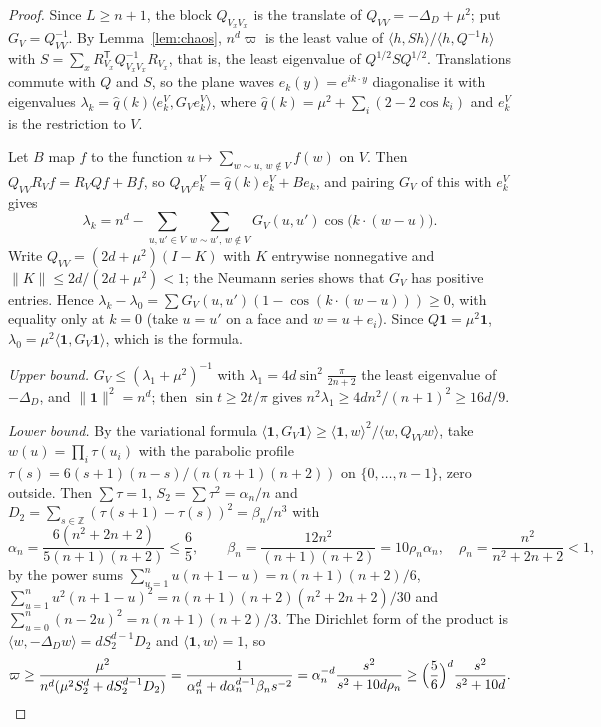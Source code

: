 \documentclass[11pt]{amsart}
\theoremstyle{definition}
\theoremstyle{remark}
\numberwithin{equation}{section}
\newcommand{\Z}{\mathbb{Z}}
\newcommand{\ip}[2]{\langle #1,#2\rangle}
\begin{document}
\begin{proof}
Since $L\ge n+1$, the block $Q_{V_xV_x}$ is the translate of $Q_{VV}=-\Delta_D+
\mu^2$; put $G_V=Q_{VV}^{-1}$. By Lemma~\ref{lem:chaos}, $n^d\varpi$ is the least
value of $\ip h{Sh}/\ip h{Q^{-1}h}$ with $S=\sum_xR_{V_x}^{\mathsf T}Q_{V_xV_x}^{-1}
R_{V_x}$, that is, the least eigenvalue of $Q^{1/2}SQ^{1/2}$. Translations commute
with $Q$ and $S$, so the plane waves $e_k(y)=e^{ik\cdot y}$ diagonalise it with
eigenvalues $\lambda_k=\hat q(k)\ip{e_k^V}{G_Ve_k^V}$, where $\hat q(k)=\mu^2+
\sum_i(2-2\cos k_i)$ and $e_k^V$ is the restriction to $V$.

Let $B$ map $f$ to the function $u\mapsto\sum_{w\sim u,\,w\notin V}f(w)$ on $V$.
Then $Q_{VV}R_Vf=R_VQf+Bf$, so $Q_{VV}e_k^V=\hat q(k)e_k^V+Be_k$, and pairing
$G_V$ of this with $e_k^V$ gives
\[
\lambda_k=n^d-\sum_{u,u'\in V}\sum_{w\sim u',\,w\notin V}G_V(u,u')\cos\bigl(k\cdot
(w-u)\bigr).
\]
Write $Q_{VV}=(2d+\mu^2)(I-K)$ with $K$ entrywise nonnegative and $\|K\|\le
2d/(2d+\mu^2)<1$; the Neumann series shows that $G_V$ has positive entries.
Hence $\lambda_k-\lambda_0=\sum G_V(u,u')(1-\cos(k\cdot(w-u)))\ge0$, with equality only
at $k=0$ (take $u=u'$ on a face and $w=u+e_i$). Since $Q\mathbf 1=\mu^2\mathbf 1$,
$\lambda_0=\mu^2\ip{\mathbf 1}{G_V\mathbf 1}$, which is the formula.

\emph{Upper bound.} $G_V\le(\lambda_1+\mu^2)^{-1}$ with $\lambda_1=4d\sin^2\frac\pi
{2n+2}$ the least eigenvalue of $-\Delta_D$, and $\|\mathbf 1\|^2=n^d$; then
$\sin t\ge2t/\pi$ gives $n^2\lambda_1\ge4dn^2/(n+1)^2\ge16d/9$.

\emph{Lower bound.} By the variational formula $\ip{\mathbf 1}{G_V\mathbf 1}\ge
\ip{\mathbf 1}w^2/\ip w{Q_{VV}w}$, take $w(u)=\prod_i\tau(u_i)$ with the parabolic
profile $\tau(s)=6(s+1)(n-s)/(n(n+1)(n+2))$ on $\{0,\dots,n-1\}$, zero
outside. Then $\sum\tau=1$, $S_2=\sum\tau^2=\alpha_n/n$ and $D_2=\sum_{s\in\Z}
(\tau(s+1)-\tau(s))^2=\beta_n/n^3$ with
\[
\alpha_n=\frac{6(n^2+2n+2)}{5(n+1)(n+2)}\le\frac65,\qquad
\beta_n=\frac{12n^2}{(n+1)(n+2)}=10\rho_n\alpha_n,\quad
\rho_n=\frac{n^2}{n^2+2n+2}<1,
\]
by the power sums $\sum_{u=1}^nu(n+1-u)=n(n+1)(n+2)/6$, $\sum_{u=1}^nu^2(n+1-u)^2=
n(n+1)(n+2)(n^2+2n+2)/30$ and $\sum_{u=0}^n(n-2u)^2=n(n+1)(n+2)/3$. The Dirichlet
form of the product is $\ip w{-\Delta_Dw}=dS_2^{d-1}D_2$ and $\ip{\mathbf 1}w=1$, so
\[
\varpi\ge\frac{\mu^2}{n^d(\mu^2S_2^d+dS_2^{d-1}D_2)}=\frac1{\alpha_n^d+d\alpha_n^{d-1}
\beta_ns^{-2}}=\alpha_n^{-d}\frac{s^2}{s^2+10d\rho_n}\ge\Bigl(\frac56\Bigr)^d
\frac{s^2}{s^2+10d}.\qedhere
\]
\end{proof}
\end{document}

